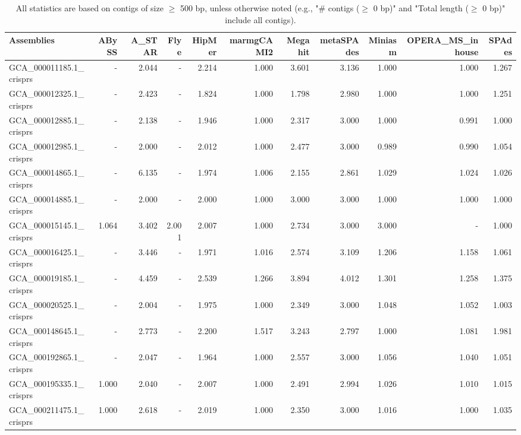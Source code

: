 \documentclass[12pt,a4paper]{article}
\begin{document}
\begin{table}[ht]
\begin{center}
\caption{All statistics are based on contigs of size $\geq$ 500 bp, unless otherwise noted (e.g., "\# contigs ($\geq$ 0 bp)" and "Total length ($\geq$ 0 bp)" include all contigs).}
\begin{tabular}{|l*{10}{|r}|}
\hline
Assemblies & ABySS & A\_STAR & Flye & HipMer & marmgCAMI2 & Megahit & metaSPAdes & Miniasm & OPERA\_MS\_inhouse & SPAdes \\ \hline
GCA\_000011185.1\_crisprs & - & 2.044 & - & 2.214 & 1.000 & 3.601 & 3.136 & 1.000 & 1.000 & 1.267 \\ \hline
GCA\_000012325.1\_crisprs & - & 2.423 & - & 1.824 & 1.000 & 1.798 & 2.980 & 1.000 & 1.000 & 1.251 \\ \hline
GCA\_000012885.1\_crisprs & - & 2.138 & - & 1.946 & 1.000 & 2.317 & 3.000 & 1.000 & 0.991 & 1.000 \\ \hline
GCA\_000012985.1\_crisprs & - & 2.000 & - & 2.012 & 1.000 & 2.477 & 3.000 & 0.989 & 0.990 & 1.054 \\ \hline
GCA\_000014865.1\_crisprs & - & 6.135 & - & 1.974 & 1.006 & 2.155 & 2.861 & 1.029 & 1.024 & 1.026 \\ \hline
GCA\_000014885.1\_crisprs & - & 2.000 & - & 2.000 & 1.000 & 3.000 & 3.000 & 1.000 & 1.000 & 1.000 \\ \hline
GCA\_000015145.1\_crisprs & 1.064 & 3.402 & 2.001 & 2.007 & 1.000 & 2.734 & 3.000 & 3.000 & - & 1.000 \\ \hline
GCA\_000016425.1\_crisprs & - & 3.446 & - & 1.971 & 1.016 & 2.574 & 3.109 & 1.206 & 1.158 & 1.061 \\ \hline
GCA\_000019185.1\_crisprs & - & 4.459 & - & 2.539 & 1.266 & 3.894 & 4.012 & 1.301 & 1.258 & 1.375 \\ \hline
GCA\_000020525.1\_crisprs & - & 2.004 & - & 1.975 & 1.000 & 2.349 & 3.000 & 1.048 & 1.052 & 1.003 \\ \hline
GCA\_000148645.1\_crisprs & - & 2.773 & - & 2.200 & 1.517 & 3.243 & 2.797 & 1.000 & 1.081 & 1.981 \\ \hline
GCA\_000192865.1\_crisprs & - & 2.047 & - & 1.964 & 1.000 & 2.557 & 3.000 & 1.056 & 1.040 & 1.051 \\ \hline
GCA\_000195335.1\_crisprs & 1.000 & 2.040 & - & 2.007 & 1.000 & 2.491 & 2.994 & 1.026 & 1.010 & 1.015 \\ \hline
GCA\_000211475.1\_crisprs & 1.000 & 2.618 & - & 2.019 & 1.000 & 2.350 & 3.000 & 1.016 & 1.000 & 1.035 \\ \hline

\end{tabular}
\end{center}
\end{table}
\end{document}
